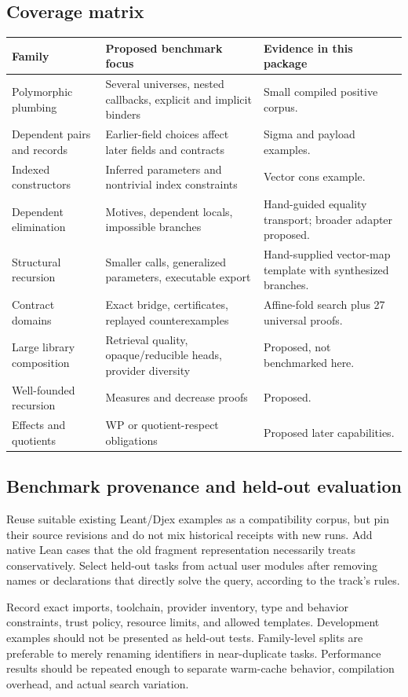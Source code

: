 \subsection{Coverage matrix}
\begin{longtable}{@{}L{0.24\textwidth}L{0.39\textwidth}L{0.29\textwidth}@{}}
\toprule
Family & Proposed benchmark focus & Evidence in this package\\\midrule\endhead
Polymorphic plumbing & Several universes, nested callbacks, explicit and implicit binders & Small compiled positive corpus.\\
Dependent pairs and records & Earlier-field choices affect later fields and contracts & Sigma and payload examples.\\
Indexed constructors & Inferred parameters and nontrivial index constraints & Vector cons example.\\
Dependent elimination & Motives, dependent locals, impossible branches & Hand-guided equality transport; broader adapter proposed.\\
Structural recursion & Smaller calls, generalized parameters, executable export & Hand-supplied vector-map template with synthesized branches.\\
Contract domains & Exact bridge, certificates, replayed counterexamples & Affine-fold search plus 27 universal proofs.\\
Large library composition & Retrieval quality, opaque/reducible heads, provider diversity & Proposed, not benchmarked here.\\
Well-founded recursion & Measures and decrease proofs & Proposed.\\
Effects and quotients & WP or quotient-respect obligations & Proposed later capabilities.\\
\bottomrule
\end{longtable}

\subsection{Benchmark provenance and held-out evaluation}
Reuse suitable existing Leant/Djex examples as a compatibility corpus, but pin their source revisions and do not mix historical receipts with new runs. Add native Lean cases that the old fragment representation necessarily treats conservatively. Select held-out tasks from actual user modules after removing names or declarations that directly solve the query, according to the track's rules.

Record exact imports, toolchain, provider inventory, type and behavior constraints, trust policy, resource limits, and allowed templates. Development examples should not be presented as held-out tests. Family-level splits are preferable to merely renaming identifiers in near-duplicate tasks. Performance results should be repeated enough to separate warm-cache behavior, compilation overhead, and actual search variation.

